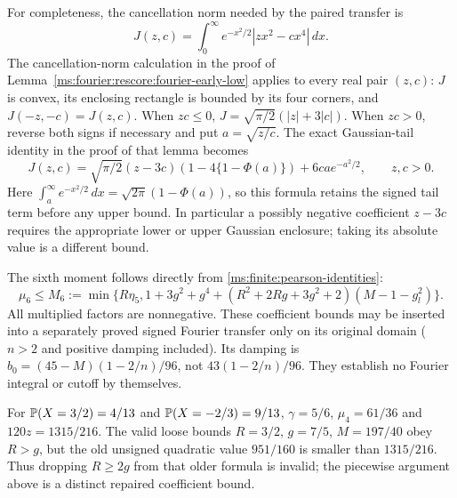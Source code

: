 For completeness, the cancellation norm needed by the paired transfer is
\[
 J(z,c)=\int_0^\infty e^{-x^2/2}|zx^2-cx^4|\,dx.
\]
The cancellation-norm calculation in the proof of
Lemma~\ref{ms:fourier:rescore:fourier-early-low} applies to every real
pair $(z,c)$: $J$ is convex, its enclosing rectangle is bounded by its
four corners, and $J(-z,-c)=J(z,c)$. When $zc\le0$,
$J=\sqrt{\pi/2}(|z|+3|c|)$. When $zc>0$, reverse both signs
if necessary and put $a=\sqrt{z/c}$. The exact Gaussian-tail identity
in the proof of that lemma becomes
\begin{equation}
 J(z,c)=\sqrt{\pi/2}(z-3c)(1-4\{1-\Phi(a)\})
          +6ca e^{-a^2/2},\qquad z,c>0.
 \label{ms:finite:paired-mills}
\end{equation}
Here $\int_a^\infty e^{-x^2/2}\,dx=\sqrt{2\pi}(1-\Phi(a))$,
so this formula retains the signed tail term before any upper bound.
In particular a possibly negative coefficient $z-3c$ requires the
appropriate lower or upper Gaussian enclosure; taking its absolute value
is a different bound.

The sixth moment follows directly from \eqref{ms:finite:pearson-identities}:
\[
 \mu_6\le M_6:=\min\{R\eta_5,
 1+3g^2+g^4+(R^2+2Rg+3g^2+2)(M-1-g_l^2)\}.
\]
All multiplied factors are nonnegative. These coefficient bounds may be
inserted into a separately proved signed Fourier transfer only on its
original domain ($n>2$ and positive damping included). Its damping is
$b_0=(45-M)(1-2/n)/96$, not $43(1-2/n)/96$.
They establish no Fourier integral or cutoff by themselves.

\begin{remark}
For $\mathbb P(X=3/2)=4/13$ and $\mathbb P(X=-2/3)=9/13$,
$\gamma=5/6$, $\mu_4=61/36$ and $120z=1315/216$.
The valid loose bounds $R=3/2$, $g=7/5$, $M=197/40$ obey $R>g$,
but the old unsigned quadratic value $951/160$ is smaller than
$1315/216$. Thus dropping $R\ge2g$ from that older formula is invalid;
the piecewise argument above is a distinct repaired coefficient bound.
\end{remark}

